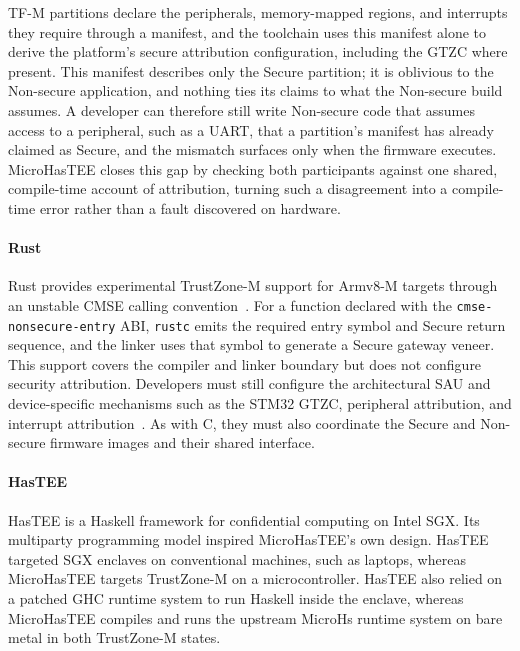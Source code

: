 \documentclass[sigconf]{acmart}
\begin{document}
TF-M partitions declare the peripherals, memory-mapped regions, and interrupts they require through a manifest, and the toolchain uses this manifest alone to derive the platform's secure attribution configuration, including the GTZC where present.
This manifest describes only the Secure partition; it is oblivious to the Non-secure application, and nothing ties its claims to what the Non-secure build assumes.
A developer can therefore still write Non-secure code that assumes access to a peripheral, such as a UART, that a partition's manifest has already claimed as Secure, and the mismatch surfaces only when the firmware executes.
MicroHasTEE closes this gap by checking both participants against one shared, compile-time account of attribution, turning such a disagreement into a compile-time error rather than a fault discovered on hardware.

\paragraph{Rust}
Rust provides experimental TrustZone-M support for Armv8-M targets through an unstable CMSE calling convention~\cite{rustCmse}.
For a function declared with the \texttt{cmse-nonsecure-entry} ABI, \texttt{rustc} emits the required entry symbol and Secure return sequence, and the linker uses that symbol to generate a Secure gateway veneer.
This support covers the compiler and linker boundary but does not configure security attribution.
Developers must still configure the architectural SAU and device-specific mechanisms such as the STM32 GTZC, peripheral attribution, and interrupt attribution~\cite{armTrustZoneM,stm32u5ReferenceManual}.
As with C, they must also coordinate the Secure and Non-secure firmware images and their shared interface.

\paragraph{HasTEE}
HasTEE\cite{DBLP:conf/haskell/SarkarKRC23} is a Haskell framework for confidential computing on Intel SGX.
Its multiparty programming model inspired MicroHasTEE's own design.
HasTEE targeted SGX enclaves on conventional machines, such as laptops, whereas MicroHasTEE targets TrustZone-M on a microcontroller.
HasTEE also relied on a patched GHC runtime system to run Haskell inside the enclave, whereas MicroHasTEE compiles and runs the upstream MicroHs runtime system on bare metal in both TrustZone-M states.
\end{document}
